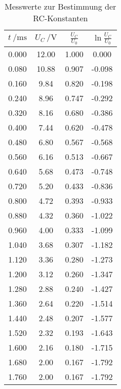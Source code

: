 \begin{table}[H]
  \centering
  \caption{Messwerte zur Bestimmung der RC-Konstanten}
  \label{tab:tabe1}
    \begin{tabular}{c c c c}
    \toprule
    $ t \: / \si{\milli\second} $ & $ U_C \: / \si {\volt} $ & $\frac{U_C}{U_0} $
    & $ \ln{\frac{U_C}{U_0}} $ \\
    \midrule
    0.000 & 12.00 & 1.000 & 0.000 \\
    0.080 & 10.88 & 0.907 & -0.098 \\
    0.160 & 9.84 & 0.820 & -0.198 \\
    0.240 & 8.96 & 0.747 & -0.292 \\
    0.320 & 8.16 & 0.680 & -0.386 \\
    0.400 & 7.44 & 0.620 & -0.478 \\
    0.480 & 6.80 & 0.567 & -0.568 \\
    0.560 & 6.16 & 0.513 & -0.667 \\
    0.640 & 5.68 & 0.473 & -0.748 \\
    0.720 & 5.20 & 0.433 & -0.836 \\
    0.800 & 4.72 & 0.393 & -0.933 \\
    0.880 & 4.32 & 0.360 & -1.022 \\
    0.960 & 4.00 & 0.333 & -1.099 \\
    1.040 & 3.68 & 0.307 & -1.182 \\
    1.120 & 3.36 & 0.280 & -1.273 \\
    1.200 & 3.12 & 0.260 & -1.347 \\
    1.280 & 2.88 & 0.240 & -1.427 \\
    1.360 & 2.64 & 0.220 & -1.514 \\
    1.440 & 2.48 & 0.207 & -1.577 \\
    1.520 & 2.32 & 0.193 & -1.643 \\
    1.600 & 2.16 & 0.180 & -1.715 \\
    1.680 & 2.00 & 0.167 & -1.792 \\
    1.760 & 2.00 & 0.167 & -1.792 \\

      \bottomrule
    \end{tabular}
\end{table}
